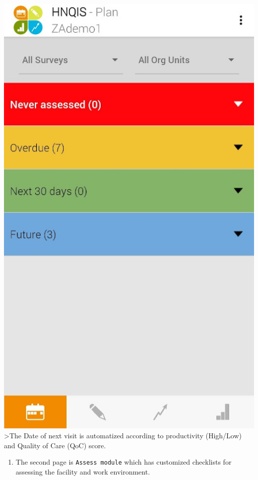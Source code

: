 \documentclass[]{book}
\providecommand{\tightlist}{%
  \setlength{\itemsep}{0pt}\setlength{\parskip}{0pt}}
\begin{document}
\includegraphics{images/hnqis-plan.jpg}
\textgreater{}The Date of next visit is automatized according to productivity (High/Low) and Quality of Care (QoC) score.

\begin{enumerate}
\def\labelenumi{\arabic{enumi}.}
\setcounter{enumi}{3}
\tightlist
\item
  The second page is \texttt{Assess\ module} which has customized checklists for assessing the facility and work environment.
\end{enumerate}
\end{document}
